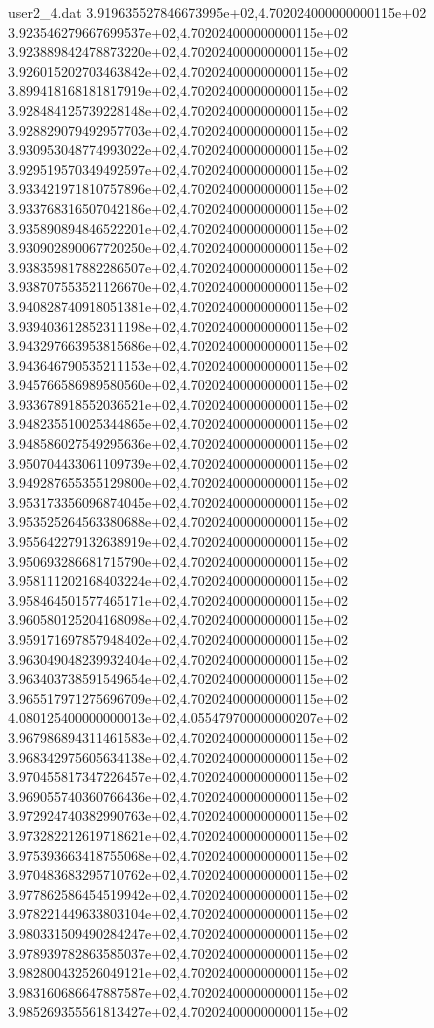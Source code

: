 \begin{filecontents}{user2_4.dat}
3.919635527846673995e+02,4.702024000000000115e+02
3.923546279667699537e+02,4.702024000000000115e+02
3.923889842478873220e+02,4.702024000000000115e+02
3.926015202703463842e+02,4.702024000000000115e+02
3.899418168181817919e+02,4.702024000000000115e+02
3.928484125739228148e+02,4.702024000000000115e+02
3.928829079492957703e+02,4.702024000000000115e+02
3.930953048774993022e+02,4.702024000000000115e+02
3.929519570349492597e+02,4.702024000000000115e+02
3.933421971810757896e+02,4.702024000000000115e+02
3.933768316507042186e+02,4.702024000000000115e+02
3.935890894846522201e+02,4.702024000000000115e+02
3.930902890067720250e+02,4.702024000000000115e+02
3.938359817882286507e+02,4.702024000000000115e+02
3.938707553521126670e+02,4.702024000000000115e+02
3.940828740918051381e+02,4.702024000000000115e+02
3.939403612852311198e+02,4.702024000000000115e+02
3.943297663953815686e+02,4.702024000000000115e+02
3.943646790535211153e+02,4.702024000000000115e+02
3.945766586989580560e+02,4.702024000000000115e+02
3.933678918552036521e+02,4.702024000000000115e+02
3.948235510025344865e+02,4.702024000000000115e+02
3.948586027549295636e+02,4.702024000000000115e+02
3.950704433061109739e+02,4.702024000000000115e+02
3.949287655355129800e+02,4.702024000000000115e+02
3.953173356096874045e+02,4.702024000000000115e+02
3.953525264563380688e+02,4.702024000000000115e+02
3.955642279132638919e+02,4.702024000000000115e+02
3.950693286681715790e+02,4.702024000000000115e+02
3.958111202168403224e+02,4.702024000000000115e+02
3.958464501577465171e+02,4.702024000000000115e+02
3.960580125204168098e+02,4.702024000000000115e+02
3.959171697857948402e+02,4.702024000000000115e+02
3.963049048239932404e+02,4.702024000000000115e+02
3.963403738591549654e+02,4.702024000000000115e+02
3.965517971275696709e+02,4.702024000000000115e+02
4.080125400000000013e+02,4.055479700000000207e+02
3.967986894311461583e+02,4.702024000000000115e+02
3.968342975605634138e+02,4.702024000000000115e+02
3.970455817347226457e+02,4.702024000000000115e+02
3.969055740360766436e+02,4.702024000000000115e+02
3.972924740382990763e+02,4.702024000000000115e+02
3.973282212619718621e+02,4.702024000000000115e+02
3.975393663418755068e+02,4.702024000000000115e+02
3.970483683295710762e+02,4.702024000000000115e+02
3.977862586454519942e+02,4.702024000000000115e+02
3.978221449633803104e+02,4.702024000000000115e+02
3.980331509490284247e+02,4.702024000000000115e+02
3.978939782863585037e+02,4.702024000000000115e+02
3.982800432526049121e+02,4.702024000000000115e+02
3.983160686647887587e+02,4.702024000000000115e+02
3.985269355561813427e+02,4.702024000000000115e+02

\end{filecontents}
